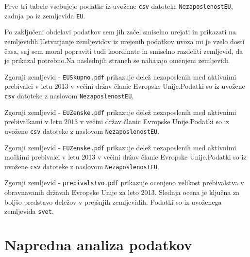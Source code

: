 \documentclass[11pt,a4paper]{article}
\begin{document}
Prve tri tabele vsebujejo podatke iz uvožene \verb|csv| datoteke \verb|NezaposlenostEU|, zadnja pa iz zemljevida \verb|EU|. 

Po zaključeni obdelavi podatkov sem jih začel smiselno urejati in prikazati na zemljevidih.Ustvarjanje zemljevidov iz urejenih podatkov uvoza mi je vzelo dosti časa, saj sem moral popraviti tudi koordinate in smiselno razdeliti zemljevid, da je prikazal potrebno.Na naslednjih straneh se nahajajo omenjeni zemljevidi. 


Zgornji zemljevid - \verb|EUSkupno.pdf| prikazuje delež nezaposlenih med aktivnimi prebivalci v letu 2013 v večini držav članic Evropske Unije.Podatki so iz uvožene \verb|csv| datoteke z naslovom \verb|NezaposlenostEU|. 


Zgornji zemljevid - \verb|EUZenske.pdf| prikazuje delež nezaposlenih med aktivnimi prebivalkami v letu 2013 v večini držav članic Evropske Unije.Podatki so iz uvožene \verb|csv| datoteke z naslovom \verb|NezaposlenostEU|. 


Zgornji zemljevid - \verb|EUZenske.pdf| prikazuje delež nezaposlenih med aktivnimi moškimi prebivalci v letu 2013 v večini držav članic Evropske Unije.Podatki so iz uvožene \verb|csv| datoteke z naslovom \verb|NezaposlenostEU|. 


Zgornji zemljevid - \verb|prebivalstvo.pdf| prikazuje ocenjeno velikost prebivalstva v obravnavanih državah Evropske Unije za leto 2013. Slednja ocena je ključna za boljšo predstavo deležov v prejšnjih zemljevidih. Podatki so iz uvoženega zemljevida \verb|svet|. 

\pagebreak
\section{Napredna analiza podatkov}
\end{document}
